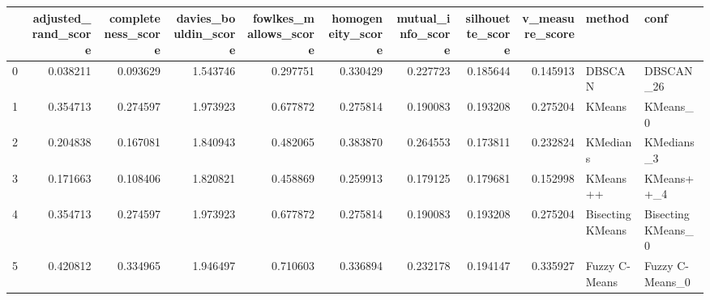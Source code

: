 \begin{tabular}{lrrrrrrrrll}
\toprule
{} &  adjusted\_rand\_score &  completeness\_score &  davies\_bouldin\_score &  fowlkes\_mallows\_score &  homogeneity\_score &  mutual\_info\_score &  silhouette\_score &  v\_measure\_score &            method &                conf \\
\midrule
0 &             0.038211 &            0.093629 &              1.543746 &               0.297751 &           0.330429 &           0.227723 &          0.185644 &         0.145913 &            DBSCAN &           DBSCAN\_26 \\
1 &             0.354713 &            0.274597 &              1.973923 &               0.677872 &           0.275814 &           0.190083 &          0.193208 &         0.275204 &            KMeans &            KMeans\_0 \\
2 &             0.204838 &            0.167081 &              1.840943 &               0.482065 &           0.383870 &           0.264553 &          0.173811 &         0.232824 &          KMedians &          KMedians\_3 \\
3 &             0.171663 &            0.108406 &              1.820821 &               0.458869 &           0.259913 &           0.179125 &          0.179681 &         0.152998 &          KMeans++ &          KMeans++\_4 \\
4 &             0.354713 &            0.274597 &              1.973923 &               0.677872 &           0.275814 &           0.190083 &          0.193208 &         0.275204 &  Bisecting KMeans &  Bisecting KMeans\_0 \\
5 &             0.420812 &            0.334965 &              1.946497 &               0.710603 &           0.336894 &           0.232178 &          0.194147 &         0.335927 &     Fuzzy C-Means &     Fuzzy C-Means\_0 \\
\bottomrule
\end{tabular}
